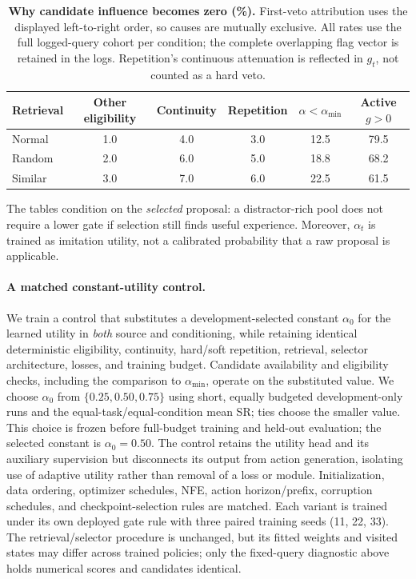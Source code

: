 \begin{table}[H]
\centering\small
\setlength{\tabcolsep}{4pt}
\caption{\textbf{Why candidate influence becomes zero (\%).}
First-veto attribution uses the displayed left-to-right order, so causes are mutually exclusive.
All rates use the full logged-query cohort per condition; the complete overlapping flag vector is retained in the logs.
Repetition's continuous attenuation is reflected in $g_t$, not counted as a hard veto.}
\label{tab:rebuttal_veto}
\begin{tabular}{@{}lccccc@{}}
\toprule
Retrieval & Other eligibility & Continuity & Repetition & $\alpha<\alpha_{\min}$ & Active $g>0$ \\
\midrule
Normal & 1.0 & 4.0 & 3.0 & 12.5 & 79.5 \\
Random & 2.0 & 6.0 & 5.0 & 18.8 & 68.2 \\
Similar & 3.0 & 7.0 & 6.0 & 22.5 & 61.5 \\
\bottomrule
\end{tabular}
\end{table}

The tables condition on the \emph{selected} proposal: a distractor-rich pool does not require a lower gate if selection still finds useful experience.
Moreover, $\alpha_t$ is trained as imitation utility, not a calibrated probability that a raw proposal is applicable.

\paragraph{A matched constant-utility control.}
We train a control that substitutes a development-selected constant $\alpha_0$ for the learned utility in \emph{both} source and conditioning, while retaining identical deterministic eligibility, continuity, hard/soft repetition, retrieval, selector architecture, losses, and training budget.
Candidate availability and eligibility checks, including the comparison to $\alpha_{\min}$, operate on the substituted value.
We choose $\alpha_0$ from $\{0.25,0.50,0.75\}$ using short, equally budgeted development-only runs and the equal-task/equal-condition mean SR; ties choose the smaller value.
This choice is frozen before full-budget training and held-out evaluation; the selected constant is $\alpha_0=\text{0.50}$.
The control retains the utility head and its auxiliary supervision but disconnects its output from action generation, isolating use of adaptive utility rather than removal of a loss or module.
Initialization, data ordering, optimizer schedules, NFE, action horizon/prefix, corruption schedules, and checkpoint-selection rules are matched.
Each variant is trained under its own deployed gate rule with three paired training seeds (11, 22, 33).
The retrieval/selector procedure is unchanged, but its fitted weights and visited states may differ across trained policies; only the fixed-query diagnostic above holds numerical scores and candidates identical.

